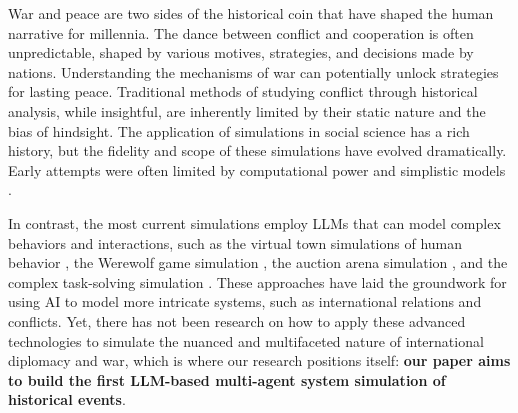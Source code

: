 \documentclass{article}
\newcommand{\lizhou}[1]{{\small\color{magenta}{\bf Lizhou: #1}}}
\begin{document}
\par War and peace are two sides of the historical coin that have shaped the human narrative for millennia. The dance between conflict and cooperation is often unpredictable, shaped by various motives, strategies, and decisions made by nations. Understanding the mechanisms of war can potentially unlock strategies for lasting peace. Traditional methods of studying conflict through historical analysis, while insightful, are inherently limited by their static nature and the bias of hindsight. The application of simulations in social science has a rich history, but the fidelity and scope of these simulations have evolved dramatically. Early attempts were often limited by computational power and simplistic models \cite{smith1970presidential, hermann1967attempt}.

\par In contrast, the most current simulations employ LLMs that can model complex behaviors and interactions, such as the virtual town simulations of human behavior \cite{park2023generative}, the Werewolf game simulation \cite{xu2023exploring}, the auction arena simulation \cite{chen2023put},  and the complex task-solving simulation \cite{ge2023openagi}. These approaches have laid the groundwork for using AI to model more intricate systems, such as international relations and conflicts. Yet, there has not been research on how to apply these advanced technologies to simulate the nuanced and multifaceted nature of international diplomacy and war, which is where our research positions itself: \textbf{our paper aims to build the first LLM-based multi-agent system simulation of historical events}.

\end{document}
